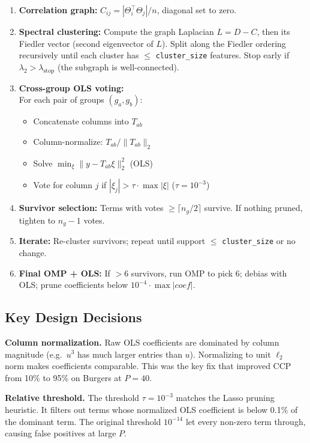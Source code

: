 \documentclass[11pt]{article}
\begin{document}
\begin{enumerate}
  \item \textbf{Correlation graph:} $C_{ij} = |\Theta_i^\top \Theta_j| / n$,
    diagonal set to zero.
  \item \textbf{Spectral clustering:} Compute the graph Laplacian
    $L = D - C$, then its Fiedler vector (second eigenvector of $L$).
    Split along the Fiedler ordering recursively until each cluster has
    $\le$ \texttt{cluster\_size} features. Stop early if
    $\lambda_2 > \lambda_{\text{stop}}$ (the subgraph is well-connected).
  \item \textbf{Cross-group OLS voting:}\\
    For each pair of groups $(g_a, g_b)$:
    \begin{itemize}
      \item Concatenate columns into $T_{ab}$
      \item Column-normalize: $T_{ab} / \|T_{ab}\|_2$
      \item Solve $\min_{\xi} \|y - T_{ab}\xi\|_2^2$ (OLS)
      \item Vote for column $j$ if $|\xi_j| > \tau \cdot \max|\xi|$
        ($\tau = 10^{-3}$)
    \end{itemize}
  \item \textbf{Survivor selection:} Terms with votes $\ge \lceil n_g/2 \rceil$
    survive. If nothing pruned, tighten to $n_g - 1$ votes.
  \item \textbf{Iterate:} Re-cluster survivors; repeat until support
    $\le$ \texttt{cluster\_size} or no change.
  \item \textbf{Final OMP + OLS:} If $>6$ survivors, run OMP to pick 6;
    debias with OLS; prune coefficients below $10^{-4} \cdot \max|coef|$.
\end{enumerate}

\subsection{Key Design Decisions}

\textbf{Column normalization.} Raw OLS coefficients are dominated by column
magnitude (e.g.\ $u^3$ has much larger entries than $u$). Normalizing
to unit $\ell_2$ norm makes coefficients comparable. This was the key
fix that improved CCP from 10\% to 95\% on Burgers at $P=40$.

\textbf{Relative threshold.} The threshold $\tau = 10^{-3}$ matches the
Lasso pruning heuristic. It filters out terms whose normalized OLS coefficient
is below 0.1\% of the dominant term. The original threshold $10^{-14}$
let every non-zero term through, causing false positives at large $P$.
\end{document}
